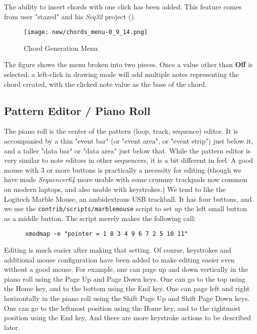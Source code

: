   The ability to insert chords with one click has been added.
   This feature comes from user "stazed"
   and his \textsl{Seq32} project (\cite{seq32}).

\begin{figure}[H]
   \centering 
   \texttt{[image: new/chords\_menu-0\_9\_14.png]}
   \caption{Chord Generation Menu}
   \label{fig:pattern_editor_chords_menu}
\end{figure}

   The figure shows the menu broken into two pieces.
   Once a value other than \textbf{Off} is selected, a left-click
   in drawing mode will add multiple notes representing the chord
   created, with the clicked note value as the base of the chord.

\subsection{Pattern Editor / Piano Roll}
\label{subsec:seq64_pattern_editor_piano_roll}

   The piano roll is the center of the pattern (loop, track, sequence) editor.
   It is accompanied by a
   thin "event bar" (or "event area", or "event strip") just below it,
   and a taller "data bar" or "data area" just below that.  While the pattern
   editor is very similar to note editors in other sequencers, it is a bit
   different in feel.  A good mouse with 3 or more buttons is practically a
   necessity for editing (though we have made \textsl{Sequencer64} more usable
   with some crummy trackpads now common on modern laptops, and also usable
   with keystrokes.) We tend to like the Logitech Marble Mouse, an ambidextrous
   USB trackball.  It has four buttons, and we use the
   \texttt{contrib/scripts/marblemouse} script to set up the left small button
   as a middle button.  The script merely makes the following call:

   \begin{verbatim}
      xmodmap -e "pointer = 1 8 3 4 9 6 7 2 5 10 11"
   \end{verbatim}

   Editing is much easier after making that setting.   Of course, keystrokes
   and additional mouse configuration have been added to make editing easier
   even without a good mouse.
   For example, one can page up and down vertically in the piano roll using the
    Page Up and 
    Page Down keys.
   One can go to the top using the 
    Home key, and
   to the bottom using the
    End key.
   One can page left and right horizontally in the piano roll using the
    Shift Page Up and 
    Shift Page Down keys.
   One can go to the leftmost position using the 
    Home key,
   and to the rightmost position using the
    End key,
   And there are more keystroke actions to be described later.

